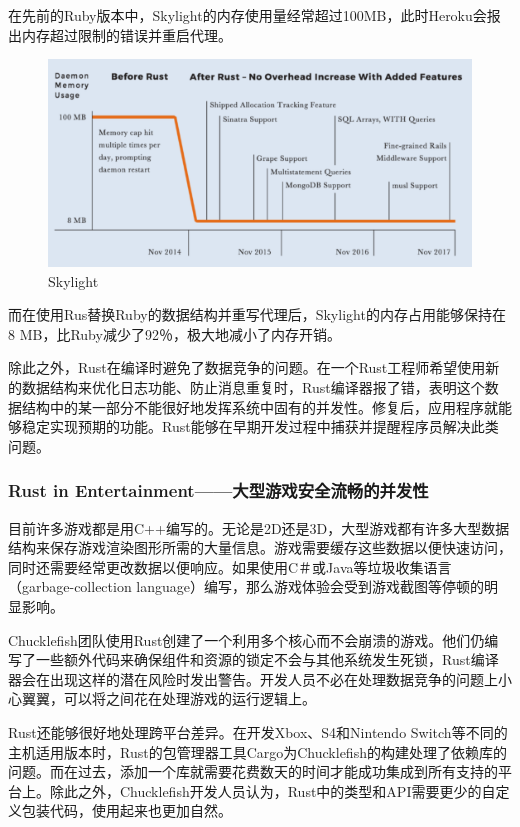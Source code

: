 \documentclass[12pt, a4paper]{article}
\begin{document}
		在先前的Ruby版本中，Skylight的内存使用量经常超过100MB，此时Heroku会报出内存超过限制的错误并重启代理。
		\begin{figure}[H]
			\centering
			\includegraphics[width=0.7\linewidth]{Z2}
			\caption{Skylight}
			\label{fig:southeast2}
		\end{figure}
		而在使用Rus替换Ruby的数据结构并重写代理后，Skylight的内存占用能够保持在8 MB，比Ruby减少了92％，极大地减小了内存开销。
		
		除此之外，Rust在编译时避免了数据竞争的问题。在一个Rust工程师希望使用新的数据结构来优化日志功能、防止消息重复时，Rust编译器报了错，表明这个数据结构中的某一部分不能很好地发挥系统中固有的并发性。修复后，应用程序就能够稳定实现预期的功能。Rust能够在早期开发过程中捕获并提醒程序员解决此类问题。
		
		\subsubsection{Rust in Entertainment——大型游戏安全流畅的并发性}
		目前许多游戏都是用C++编写的。无论是2D还是3D，大型游戏都有许多大型数据结构来保存游戏渲染图形所需的大量信息。游戏需要缓存这些数据以便快速访问，同时还需要经常更改数据以便响应。如果使用C＃或Java等垃圾收集语言（garbage-collection language）编写，那么游戏体验会受到游戏截图等停顿的明显影响。
		
		Chucklefish团队使用Rust创建了一个利用多个核心而不会崩溃的游戏。他们仍编写了一些额外代码来确保组件和资源的锁定不会与其他系统发生死锁，Rust编译器会在出现这样的潜在风险时发出警告。开发人员不必在处理数据竞争的问题上小心翼翼，可以将之间花在处理游戏的运行逻辑上。
		
		Rust还能够很好地处理跨平台差异。在开发Xbox、S4和Nintendo Switch等不同的主机适用版本时，Rust的包管理器工具Cargo为Chucklefish的构建处理了依赖库的问题。而在过去，添加一个库就需要花费数天的时间才能成功集成到所有支持的平台上。除此之外，Chucklefish开发人员认为，Rust中的类型和API需要更少的自定义包装代码，使用起来也更加自然。
		
\end{document}
